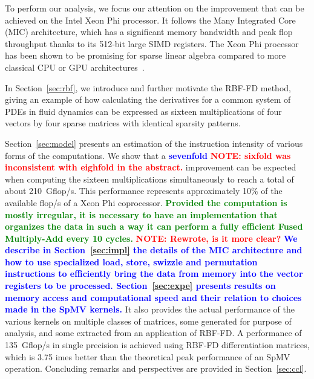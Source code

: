 \documentclass{sig-alternate}
\def\red#1{\textbf{\textcolor{red}{#1}}}
\def\blue#1{\textbf{\textcolor{blue}{#1}}}
\def\green#1{\textbf{\textcolor{green}{#1}}}
\def\ee#1{{\green{#1}}}
\def\ge#1{{\blue{#1}}}
\def\NOTE#1{{\red{NOTE: #1}}}
\begin{document}
To perform our analysis, we focus our attention on the improvement
that can be achieved on the Intel Xeon Phi processor. It follows the
Many Integrated Core (MIC) architecture, which has a significant
memory bandwidth and peak flop throughput thanks to its 512-bit large
SIMD registers. The Xeon Phi processor has been shown to be promising
for sparse linear algebra compared to more classical CPU or GPU
architectures~\cite{Saule13-ARXIV, Liu:2013:ESM:2464996.2465013, cramer2012openmp}.

In Section~\ref{sec:rbf}, we introduce and further motivate the RBF-FD method, giving 
an example of how calculating the derivatives for a common system of PDEs in fluid dynamics 
can be expressed as sixteen multiplications of four vectors by four sparse matrices with 
identical sparsity patterns.

Section~\ref{sec:model} presents an
estimation of the instruction intensity of various forms of the
computations. We show that a \ge{sevenfold} \NOTE{sixfold was inconsistent with eighfold in the abstract.} improvement can be
expected when computing the sixteen multiplications simultaneously to
reach a total of about 210~Gflop/s. This performance represents
approximately 10\% of the available flop/s of a Xeon Phi
coprocessor. \ee{Provided the computation is mostly irregular, it is necessary to have an implementation that organizes the data in such a way it can perform a fully efficient Fused Multiply-Add every 10 cycles.} \NOTE{Rewrote, is it more clear?}
\ge{We describe in Section~\ref{sec:impl} the details of the MIC
architecture and how to use specialized load, store, swizzle and
permutation instructions to efficiently bring the data from memory into the vector
registers to be processed. Section~\ref{sec:expe} presents results on 
memory access and computational speed and their relation to choices made in the 
SpMV kernels.}
It also provides the actual performance of the various kernels on multiple classes of matrices, 
some generated for purpose of analysis, and some extracted from an application of RBF-FD. 
A performance of 135~Gflop/s in single precision is achieved using RBF-FD differentiation matrices, which is 3.75 imes better than the theoretical peak performance of an SpMV operation. Concluding remarks and perspectives are provided in Section~\ref{sec:ccl}.
\end{document}
